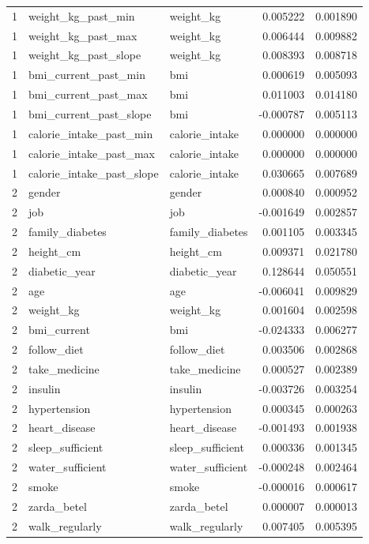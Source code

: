 \begin{longtable}{rllrr}
1 & weight\_kg\_past\_min & weight\_kg & 0.005222 & 0.001890 \\
1 & weight\_kg\_past\_max & weight\_kg & 0.006444 & 0.009882 \\
1 & weight\_kg\_past\_slope & weight\_kg & 0.008393 & 0.008718 \\
1 & bmi\_current\_past\_min & bmi & 0.000619 & 0.005093 \\
1 & bmi\_current\_past\_max & bmi & 0.011003 & 0.014180 \\
1 & bmi\_current\_past\_slope & bmi & -0.000787 & 0.005113 \\
1 & calorie\_intake\_past\_min & calorie\_intake & 0.000000 & 0.000000 \\
1 & calorie\_intake\_past\_max & calorie\_intake & 0.000000 & 0.000000 \\
1 & calorie\_intake\_past\_slope & calorie\_intake & 0.030665 & 0.007689 \\
2 & gender & gender & 0.000840 & 0.000952 \\
2 & job & job & -0.001649 & 0.002857 \\
2 & family\_diabetes & family\_diabetes & 0.001105 & 0.003345 \\
2 & height\_cm & height\_cm & 0.009371 & 0.021780 \\
2 & diabetic\_year & diabetic\_year & 0.128644 & 0.050551 \\
2 & age & age & -0.006041 & 0.009829 \\
2 & weight\_kg & weight\_kg & 0.001604 & 0.002598 \\
2 & bmi\_current & bmi & -0.024333 & 0.006277 \\
2 & follow\_diet & follow\_diet & 0.003506 & 0.002868 \\
2 & take\_medicine & take\_medicine & 0.000527 & 0.002389 \\
2 & insulin & insulin & -0.003726 & 0.003254 \\
2 & hypertension & hypertension & 0.000345 & 0.000263 \\
2 & heart\_disease & heart\_disease & -0.001493 & 0.001938 \\
2 & sleep\_sufficient & sleep\_sufficient & 0.000336 & 0.001345 \\
2 & water\_sufficient & water\_sufficient & -0.000248 & 0.002464 \\
2 & smoke & smoke & -0.000016 & 0.000617 \\
2 & zarda\_betel & zarda\_betel & 0.000007 & 0.000013 \\
2 & walk\_regularly & walk\_regularly & 0.007405 & 0.005395 \\

\end{longtable}
